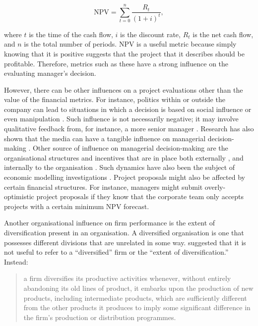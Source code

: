 \documentclass[a4paper, nobind, dvipsnames]{templates/ociamthesis}
\theoremstyle{definition}
\theoremstyle{definition}
\theoremstyle{definition}
\theoremstyle{definition}
\theoremstyle{remark}
\begin{document}
\begin{equation}
\text{NPV}=\sum_{t=0}^n \frac{R_t}{(1+i)^t}, \label{eq:npv}
\end{equation}

where \(t\) is the time of the cash flow, \(i\) is the discount rate, \(R_t\) is the
net cash flow, and \(n\) is the total number of periods. NPV is a useful metric
because simply knowing that it is positive suggests that the project that it
describes should be profitable. Therefore, metrics such as these have a strong
influence on the evaluating manager's decision.

However, there can be other influences on a project evaluations other than the
value of the financial metrics. For instance, politics within or outside the
company can lead to situations in which a decision is based on social influence
or even manipulation \autocite{garbuio2017}. Such influence is not necessarily negative; it may involve
qualitative feedback from, for instance, a more senior manager \autocite{thamhain2014}.
Research has also shown that the media can have a tangible influence on
managerial decision-making \autocite{bednar2013,liu2013}. Other source of influence on
managerial decision-making are the organisational structures and incentives that
are in place both externally \autocite{kokkinis2019}, and internally to the organisation
\autocite{ullrich2004}. Such dynamics have also been the subject of economic modelling
investigations \autocite{reichelstein1997,cavagnac2005,ortner2017}. Project
proposals might also be affected by certain financial structures. For instance,
managers might submit overly-optimistic project proposals if they know that the
corporate team only accepts projects with a certain minimum NPV forecast.

Another organisational influence on firm performance is the extent of
diversification present in an organisation. A diversified organisation is one
that possesses different divisions that are unrelated in some way. \textcite[p.~96]{penrose2009} suggested that it is not useful to refer to a ``diversified'' firm or the
``extent of diversification.'' Instead:

\begin{quote}
a firm diversifies its productive activities whenever, without entirely
abandoning its old lines of product, it embarks upon the production of new
products, including intermediate products, which are sufficiently different
from the other products it produces to imply some significant difference in
the firm's production or distribution programmes.
\end{quote}
\end{document}
